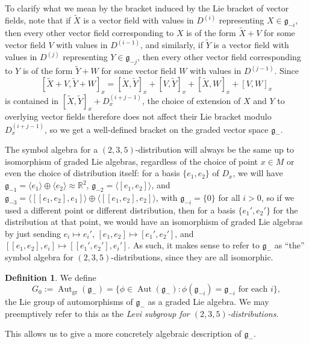\documentclass[12pt,a4paper]{amsart}
\theoremstyle{definition}
\newtheorem{definition}[theorem]{Definition}
\DeclareMathOperator{\Aut}{Aut}
\begin{document}
To clarify what we mean by the bracket induced by the Lie bracket of vector fields, note that if $\tilde{X}$ is a vector field with values in $D^{(i)}$ representing $X\in\mathfrak{g}_{-i}$, then every other vector field corresponding to $X$ is of the form $\tilde{X}+V$ for some vector field $V$ with values in $D^{(i-1)}$, and similarly, if $\tilde{Y}$ is a vector field with values in $D^{(j)}$ representing $Y\in\mathfrak{g}_{-j}$, then every other vector field corresponding to $Y$ is of the form $\tilde{Y}+W$ for some vector field $W$ with values in $D^{(j-1)}$. Since
\[[\tilde{X}+V,\tilde{Y}+W]_x=[\tilde{X},\tilde{Y}]_x+[V,\tilde{Y}]_x+[\tilde{X},W]_x+[V,W]_x\]
is contained in $[\tilde{X},\tilde{Y}]_x+D^{(i+j-1)}_x$, the choice of extension of $X$ and $Y$ to overlying vector fields therefore does not affect their Lie bracket modulo $D^{(i+j-1)}_x$, so we get a well-defined bracket on the graded vector space $\mathfrak{g}_-$.

The symbol algebra for a $(2,3,5)$-distribution will always be the same up to isomorphism of graded Lie algebras, regardless of the choice of point $x\in M$ or even the choice of distribution itself: for a basis $\{e_1,e_2\}$ of $D_x$, we will have $\mathfrak{g}_{-1}=\langle e_1\rangle\oplus\langle e_2\rangle\approx\mathbb{R}^2$, $\mathfrak{g}_{-2}=\langle[e_1,e_2]\rangle$, and $\mathfrak{g}_{-3}=\langle[[e_1,e_2],e_1]\rangle\oplus\langle[[e_1,e_2],e_2]\rangle$, with $\mathfrak{g}_{-i}=\{0\}$ for all $i>0$, so if we used a different point or different distribution, then for a basis $\{e_1',e_2'\}$ for the distribution at that point, we would have an isomorphism of graded Lie algebras by just sending $e_i\mapsto e_i'$, $[e_1,e_2]\mapsto[e_1',e_2']$, and $[[e_1,e_2],e_i]\mapsto[[e_1',e_2'],e_i']$. As such, it makes sense to refer to $\mathfrak{g}_-$ as ``the'' symbol algebra for $(2,3,5)$-distributions, since they are all isomorphic.

\begin{definition}We define
\[G_0:=\Aut_\mathrm{gr}(\mathfrak{g}_-)=\{\phi\in\Aut(\mathfrak{g}_-):\phi(\mathfrak{g}_{-i})=\mathfrak{g}_{-i}\text{ for each }i\},\] the Lie group of automorphisms of $\mathfrak{g}_-$ as a graded Lie algebra. We may preemptively refer to this as the \emph{Levi subgroup for $(2,3,5)$-distributions}.\end{definition}

This allows us to give a more concretely algebraic description of $\mathfrak{g}_-$.
\end{document}
